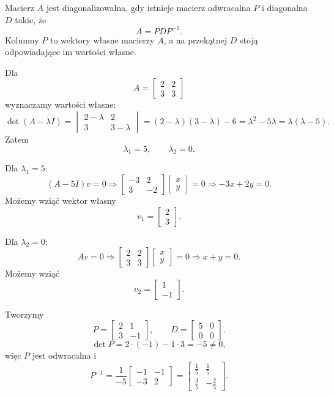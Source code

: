 \documentclass[12pt,a4paper]{article}
\begin{document}
Macierz $A$ jest diagonalizowalna, gdy istnieje macierz odwracalna $P$ i diagonalna $D$ takie, że
\[
A=PDP^{-1}.
\]
Kolumny $P$ to wektory własne macierzy $A$, a na przekątnej $D$ stoją odpowiadające im wartości własne.

Dla
\[
A=
\begin{bmatrix}
2&2\\
3&3
\end{bmatrix}
\]
wyznaczamy wartości własne:
\[
\det(A-\lambda I)=
\begin{vmatrix}
2-\lambda&2\\
3&3-\lambda
\end{vmatrix}
=(2-\lambda)(3-\lambda)-6
=\lambda^2-5\lambda
=\lambda(\lambda-5).
\]
Zatem
\[
\lambda_1=5,\qquad \lambda_2=0.
\]

Dla $\lambda_1=5$:
\[
(A-5I)v=0
\Rightarrow
\begin{bmatrix}
-3&2\\
3&-2
\end{bmatrix}
\begin{bmatrix}x\\y\end{bmatrix}=0
\Rightarrow -3x+2y=0.
\]
Możemy wziąć wektor własny
\[
v_1=\begin{bmatrix}2\\3\end{bmatrix}.
\]

Dla $\lambda_2=0$:
\[
Av=0
\Rightarrow
\begin{bmatrix}
2&2\\
3&3
\end{bmatrix}
\begin{bmatrix}x\\y\end{bmatrix}=0
\Rightarrow x+y=0.
\]
Możemy wziąć
\[
v_2=\begin{bmatrix}1\\-1\end{bmatrix}.
\]

Tworzymy
\[
P=\begin{bmatrix}2&1\\3&-1\end{bmatrix},
\qquad
D=\begin{bmatrix}5&0\\0&0\end{bmatrix}.
\]
\[
\det P=2\cdot(-1)-1\cdot3=-5\neq 0,
\]
więc $P$ jest odwracalna i
\[
P^{-1}=\frac1{-5}
\begin{bmatrix}
-1&-1\\
-3&2
\end{bmatrix}
=
\begin{bmatrix}
\frac15&\frac15\\
\frac35&-\frac25
\end{bmatrix}.
\]
\end{document}
